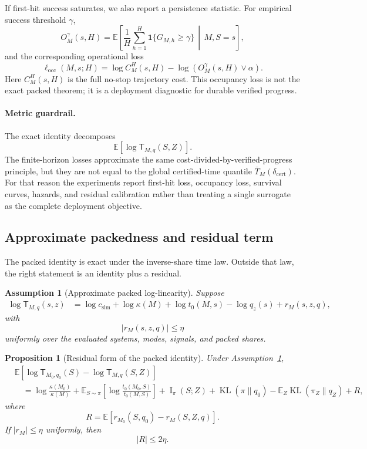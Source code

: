 \documentclass{article}
\newtheorem{assumption}{Assumption}
\newtheorem{proposition}{Proposition}
\DeclareMathOperator{\KL}{KL}
\DeclareMathOperator{\MI}{I}
\newcommand{\E}{\mathbb{E}}
\newcommand{\one}{\mathbf{1}}
\begin{document}
If first-hit success saturates, we also report a persistence statistic.  For empirical
success threshold \(\gamma\),
\[
    O_M^\gamma(s,H)
    =
    \E\left[
        \frac1H\sum_{h=1}^H
        \one\{G_{M,h}\ge\gamma\}
        \,\middle|\,
        M,S=s
    \right],
\]
and the corresponding operational loss
\[
    \ell_{\mathrm{occ}}(M,s;H)
    =
    \log C_M^H(s,H)-\log(O_M^\gamma(s,H)\vee\alpha).
\]
Here \(C_M^H(s,H)\) is the full no-stop trajectory cost.
This occupancy loss is not the exact packed theorem; it is a deployment diagnostic for
durable verified progress.

\paragraph{Metric guardrail.}
The exact identity decomposes
\[
    \E[\log \mathsf T_{M,q}(S,Z)].
\]
The finite-horizon losses approximate the same cost-divided-by-verified-progress principle,
but they are not equal to the global certified-time quantile
\(\overline T_M(\delta_{\mathrm{cert}})\).
For that reason the experiments report first-hit loss, occupancy loss, survival curves,
hazards, and residual calibration rather than treating a single surrogate as the complete
deployment objective.

\subsection{Approximate packedness and residual term}

The packed identity is exact under the inverse-share time law.  Outside that law, the
right statement is an identity plus a residual.

\begin{assumption}[Approximate packed log-linearity]
\label{ass:app-approx-packed}
Suppose
\[
\begin{aligned}
    \log \mathsf T_{M,q}(s,z)
    &=
    \log c_{\mathrm{sim}}
    +
    \log\kappa(M)
    +
    \log t_0(M,s)
    -
    \log q_z(s)
    +
    r_M(s,z,q),
\end{aligned}
\]
with
\[
    |r_M(s,z,q)|\le \eta
\]
uniformly over the evaluated systems, modes, signals, and packed shares.
\end{assumption}

\begin{proposition}[Residual form of the packed identity]
\label{prop:app-residual-decomp}
Under Assumption~\ref{ass:app-approx-packed},
\[
\begin{aligned}
&\E[
    \log \mathsf T_{M_0,q_0}(S)
    -
    \log \mathsf T_{M,q}(S,Z)
]
\\
&\quad =
\log\frac{\kappa(M_0)}{\kappa(M)}
+
\E_{S\sim\pi}
\left[
    \log\frac{t_0(M_0,S)}{t_0(M,S)}
\right]
+
\MI_\pi(S;Z)
+
\KL(\pi\|q_0)
-
\E_Z\KL(\pi_Z\|q_Z)
+
R,
\end{aligned}
\]
where
\[
    R=
    \E[r_{M_0}(S,q_0)-r_M(S,Z,q)].
\]
If \(|r_M|\le\eta\) uniformly, then
\[
    |R|\le 2\eta.
\]
\end{proposition}
\end{document}
